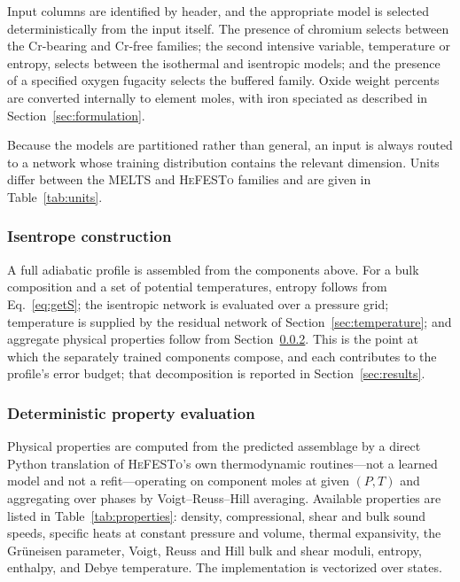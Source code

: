 Input columns are identified by header, and the appropriate model is selected
deterministically from the input itself. The presence of chromium selects between the
Cr-bearing and Cr-free families; the second intensive variable, temperature or
entropy, selects between the isothermal and isentropic models; and the presence of a
specified oxygen fugacity selects the buffered family. Oxide weight percents are
converted internally to element moles, with iron speciated as described in
Section~\ref{sec:formulation}.

Because the models are partitioned rather than general, an input is always routed to a
network whose training distribution contains the relevant dimension. Units differ
between the \textsc{MELTS} and \textsc{HeFESTo} families and are given in
Table~\ref{tab:units}.


\subsubsection{Isentrope construction}

A full adiabatic profile is assembled from the components above. For a bulk
composition and a set of potential temperatures, entropy follows from
Eq.~\eqref{eq:getS}; the isentropic network is evaluated over a pressure grid;
temperature is supplied by the residual network of Section~\ref{sec:temperature}; and
aggregate physical properties follow from Section~\ref{sec:eos}. This is the point at
which the separately trained components compose, and each contributes to the profile's
error budget; that decomposition is reported in Section~\ref{sec:results}.

\subsubsection{Deterministic property evaluation}
\label{sec:eos}

Physical properties are computed from the predicted assemblage by a direct Python
translation of \textsc{HeFESTo}'s own thermodynamic routines---not a learned model and
not a refit---operating on component moles at given $(P,T)$ and aggregating over
phases by Voigt--Reuss--Hill averaging. Available properties are listed in
Table~\ref{tab:properties}: density, compressional, shear and bulk sound speeds,
specific heats at constant pressure and volume, thermal expansivity, the Gr\"uneisen
parameter, Voigt, Reuss and Hill bulk and shear moduli, entropy, enthalpy, and Debye
temperature. The implementation is vectorized over states.

